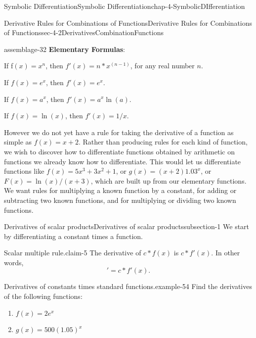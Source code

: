 \documentclass[oneside,10pt,]{book}
\newcommand{\terminology}[1]{\textbf{#1}}
\numberwithin{equation}{section}
\begin{document}
\begin{chapterptx}{Symbolic Differentiation}{}{Symbolic Differentiation}{}{}{chap-4-SymbolicDIfferentiation}
\begin{sectionptx}{Derivative Rules for Combinations of Functions}{}{Derivative Rules for Combinations of Functions}{}{}{sec-4-2DerivativesCombinationFunctions}
\begin{introduction}{}%
\begin{assemblage}{}{assemblage-32}%
\hypertarget{p-1519}{}%
\terminology{Elementary Formulas}:%
\par
\hypertarget{p-1520}{}%
If f\((x)=x^n\), then \(f'(x)=n*x^{(n-1)}\), for any real number \(n\).%
\par
\hypertarget{p-1521}{}%
If \(f(x)=e^x\), then \(f'(x)=e^x\).%
\par
\hypertarget{p-1522}{}%
If \(f(x)=a^x\), then \(f'(x)=a^x \ln(a)\).%
\par
\hypertarget{p-1523}{}%
If \(f(x)=\ln(x)\), then \(f'(x)= 1/x\).%
\end{assemblage}
\hypertarget{p-1524}{}%
However we do not yet have a rule for taking the derivative of a function as simple as \(f(x)=x+2\).  Rather than producing rules for each kind of function, we wish to discover how to differentiate functions obtained by arithmetic on functions we already know how to differentiate.  This would let us differentiate functions like \(f(x)=5 x^3+3x^2+1\), or \(g(x)=(x+2) 1.03^x\), or \(F(x)= \ln(x)/(x+3)\), which are built up from our elementary functions.  We want rules for multiplying a known function by a constant, for adding or subtracting two known functions, and for multiplying or dividing two known functions.%
\end{introduction}%
%
%
\typeout{************************************************}
\typeout{************************************************}
%
\begin{subsectionptx}{Derivatives of scalar products}{}{Derivatives of scalar products}{}{}{subsection-1}
\hypertarget{p-1525}{}%
We start by differentiating a constant times a function.%
\begin{claim}{Scalar multiple rule.}{}{claim-5}%
\hypertarget{p-1526}{}%
The derivative of \(c*f(x)\) is \(c*f'(x)\).   In other words,%
\begin{equation*}
[c*f(x)]'=c*f'(x)\text{.}
\end{equation*}
%
\end{claim}
\begin{example}{Derivatives of constants times standard functions.}{example-54}%
\hypertarget{p-1527}{}%
Find the derivatives of the following functions:%
\leavevmode%
\begin{enumerate}[label=(\alph*)]
\item\hypertarget{li-477}{}\(f(x)=2e^x\)%
\item\hypertarget{li-478}{}\(g(x)=500(1.05)^x\)%

\end{enumerate}
\end{example}
\end{subsectionptx}
\end{sectionptx}
\end{chapterptx}
\end{document}

